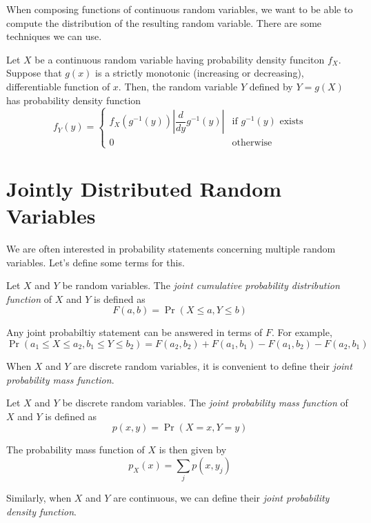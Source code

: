 \documentclass{article}
\begin{document}
When composing functions of continuous random variables, we want to be able to compute the distribution of the resulting random variable.
There are some techniques we can use.

\begin{theorem}
  Let $X$ be a continuous random variable having probability density funciton $f_X$.
  Suppose that $g(x)$ is a strictly monotonic (increasing or decreasing), differentiable function of $x$.
  Then, the random variable $Y$ defined by $Y = g(X)$ has probability density function
  \[
    f_Y(y) = \begin{cases}
      f_X(g^{-1}(y)) \left| \dfrac{d}{dy} g^{-1}(y) \right| & \text{if } g^{-1}(y) \text{ exists} \\
      0                                                     & \text{otherwise}
    \end{cases}
  \]
\end{theorem}

\section{Jointly Distributed Random Variables}

We are often interested in probability statements concerning multiple random variables.
Let's define some terms for this.

\begin{definition}
  Let $X$ and $Y$ be random variables.
  The \emph{joint cumulative probability distribution function} of $X$ and $Y$ is defined as
  \[
    F(a, b) = \Pr(X \leq a, Y \leq b)
  \]
\end{definition}
Any joint probabiltiy statement can be answered in terms of $F$.
For example,
\[
  \Pr(a_1 \leq X \leq a_2, b_1 \leq Y \leq b_2) = F(a_2, b_2) + F(a_1, b_1) - F(a_1, b_2) - F(a_2, b_1)
\]

When $X$ and $Y$ are discrete random variables, it is convenient to define their \emph{joint probability mass function}.

\begin{definition}
  Let $X$ and $Y$ be discrete random variables.
  The \emph{joint probability mass function} of $X$ and $Y$ is defined as
  \[
    p(x, y) = \Pr(X = x, Y = y)
  \]
\end{definition}
The probability mass function of $X$ is then given by
\[
  p_X(x) = \sum_j p(x, y_j)
\]

Similarly, when $X$ and $Y$ are continuous, we can define their \emph{joint probability density function}.
\end{document}
